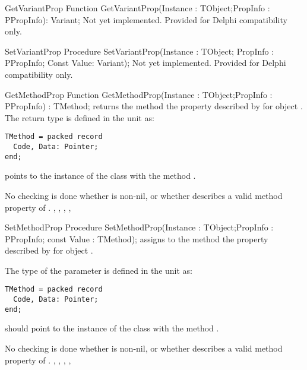 \begin{function}{GetVariantProp}
\Declaration
Function GetVariantProp(Instance : TObject;PropInfo : PPropInfo): Variant;
\Description
Not yet implemented. Provided for Delphi compatibility only.
\Errors
\SeeAlso
\end{function}


\begin{procedure}{SetVariantProp}
\Declaration
Procedure SetVariantProp(Instance : TObject;
                         PropInfo : PPropInfo;
                         Const Value: Variant);
\Description
Not yet implemented. Provided for Delphi compatibility only.
\Errors
\SeeAlso
\end{procedure}


\begin{function}{GetMethodProp}
\Declaration
Function GetMethodProp(Instance : TObject;PropInfo : PPropInfo) : TMethod;
\Description
{} returns the method the property described by
 for object .
The return type  is defined in the  unit as:
\begin{verbatim}
TMethod = packed record
  Code, Data: Pointer;
end;                                                                         
\end{verbatim}
 points to the instance of the class with the method .

\Errors
No checking is done whether  is non-nil, or whether
 describes a valid method property of .
\SeeAlso
{}, , ,
, 
\end{function}


\begin{procedure}{SetMethodProp}
\Declaration
Procedure SetMethodProp(Instance : TObject;PropInfo : PPropInfo; const Value : TMethod);
\Description
{} assigns  to the method the property described 
by  for object .

The type  of the  parameter is defined in the
 unit as:
\begin{verbatim}
TMethod = packed record
  Code, Data: Pointer;
end;                                                                         
\end{verbatim}
 should point to the instance of the class with the method .

\Errors
No checking is done whether  is non-nil, or whether
 describes a valid method property of .
\SeeAlso
{}, , ,
, 
\end{procedure}

